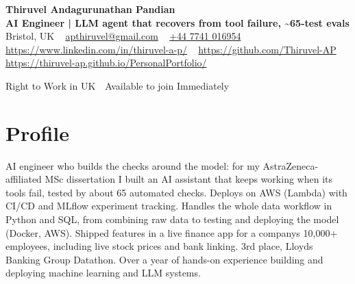 \documentclass[a4paper,11pt]{article}
\begin{document}
\begin{center}
  {\LARGE\bfseries Thiruvel Andagurunathan Pandian} \\[3pt]
  {\color{headernavy}\small\textbf{AI Engineer | LLM agent that recovers from tool failure, \textasciitilde{}65-test evals}} \\[3pt]
  {\small
  Bristol, UK\nobreak\ \,\textbar\, \href{mailto:apthiruvel@gmail.com}{apthiruvel@gmail.com}\nobreak\ \,\textbar\, \href{tel:+447741016954}{+44 7741 016954}\nobreak\ \,\textbar\, \href{https://www.linkedin.com/in/thiruvel-a-p/}{https://www.linkedin.com/in/thiruvel-a-p/}\nobreak\ \,\textbar\, \href{https://github.com/Thiruvel-AP}{https://github.com/Thiruvel-AP}\nobreak\ \,\textbar\, \href{https://thiruvel-ap.github.io/PersonalPortfolio/}{https://thiruvel-ap.github.io/PersonalPortfolio/}}\par\vspace{4pt}
  \noindent{} Right to Work in UK \,\textbar\, Available to join Immediately
\end{center}

\section{Profile}
AI engineer who builds the checks around the model: for my AstraZeneca-affiliated MSc dissertation I built an AI assistant that keeps working when its tools fail, tested by about 65 automated checks. Deploys on AWS (Lambda) with CI/CD and MLflow experiment tracking. Handles the whole data workflow in Python and SQL, from combining raw data to testing and deploying the model (Docker, AWS). Shipped features in a live finance app for a company\textquotesingle{}s 10,000+ employees, including live stock prices and bank linking. 3rd place, Lloyd\textquotesingle{}s Banking Group Datathon. Over a year of hands-on experience building and deploying machine learning and LLM systems.
\end{document}
